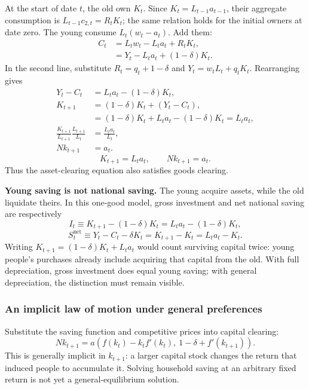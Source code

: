 At the start of date $t$, the old own $K_t$. Since
$K_t=L_{t-1}a_{t-1}$, their aggregate consumption is
$L_{t-1}c_{2,t}=R_tK_t$; the same relation holds for the initial owners at
date zero. The young consume $L_t(w_t-a_t)$. Add them:
\begin{align}
C_t&=L_tw_t-L_ta_t+R_tK_t,\\
&=Y_t-L_ta_t+(1-\delta)K_t.
\end{align}
In the second line, substitute $R_t=q_t+1-\delta$ and
$Y_t=w_tL_t+q_tK_t$. Rearranging gives
\begin{align}
Y_t-C_t&=L_ta_t-(1-\delta)K_t,\\
K_{t+1}&=(1-\delta)K_t+(Y_t-C_t),\\
 &=(1-\delta)K_t+L_ta_t-(1-\delta)K_t=L_ta_t,\\
\frac{K_{t+1}}{L_{t+1}}\frac{L_{t+1}}{L_t}
 &=\frac{L_ta_t}{L_t},\\
Nk_{t+1}&=a_t.
\end{align}
\begin{equation}\label{eq:olg-capital-market}
K_{t+1}=L_ta_t,\qquad Nk_{t+1}=a_t.
\end{equation}
Thus the asset-clearing equation also satisfies goods clearing.

\begin{blueblock}
\textbf{Young saving is not national saving.}
The young acquire assets, while the old liquidate theirs. In this one-good
model, gross investment and net national saving are respectively
\[
I_t\equiv K_{t+1}-(1-\delta)K_t
=L_ta_t-(1-\delta)K_t,
\]
\[
S_t^{\mathrm{net}}\equiv Y_t-C_t-\delta K_t
=K_{t+1}-K_t=L_ta_t-K_t.
\]
Writing $K_{t+1}=(1-\delta)K_t+L_ta_t$ would count surviving capital twice:
young people's purchases already include acquiring that capital from the
old. With full depreciation, gross investment does equal young saving;
with general depreciation, the distinction must remain visible.
\end{blueblock}

\subsubsection{An implicit law of motion under general preferences}

Substitute the saving function and competitive prices into capital clearing:
\begin{equation}\label{eq:olg-implicit-map}
Nk_{t+1}
=a\!\left(f(k_t)-k_tf'(k_t),\ 1-\delta+f'(k_{t+1})\right).
\end{equation}
This is generally implicit in $k_{t+1}$: a larger capital stock changes the
return that induced people to accumulate it. Solving household saving at an
arbitrary fixed return is not yet a general-equilibrium solution.

